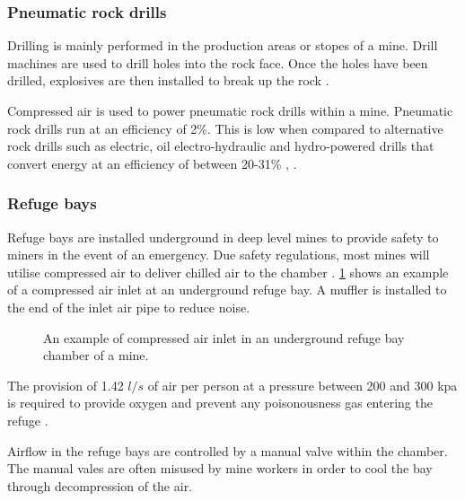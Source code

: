 \subsubsection{Pneumatic rock drills}
Drilling is mainly performed in the production areas or stopes of a mine. Drill machines are used to drill holes into the rock face. Once the holes have been drilled, explosives are then installed to break up the rock \cite{van2008development}.
\par
Compressed air is used to power pneumatic rock drills within a mine. Pneumatic rock drills run at an efficiency of 2\%. This is low when compared to alternative rock drills such as electric, oil electro-hydraulic and hydro-powered drills that convert energy at an efficiency of between 20-31\% \cite{fraser2008saving}, \cite{vanTonder2010Masters}. 
\subsubsection{Refuge bays}
Refuge bays are installed underground in deep level mines to provide safety to miners in the event of an emergency. Due safety regulations, most mines will utilise compressed air to deliver chilled air to the chamber \cite{brake1999criteria}. \cref{fig: Refuge Bay} shows an example of a compressed air inlet at an underground refuge bay. A muffler is installed to the end of the inlet air pipe to reduce noise.
\begin{figure}[h]
	\centering
	\caption{An example of compressed air inlet in an underground refuge bay chamber of a mine.}
	\label{fig: Refuge Bay}
\end{figure}
\par The provision of 1.42 $l/s$ of air per person at a pressure between 200 and 300 \gls{kpa} is required to provide oxygen and prevent any poisonousness gas entering the refuge \cite{brake1999criteria}.\par
Airflow in the refuge bays are controlled by a manual valve within the chamber. The manual vales are often misused by mine workers in order to cool the bay through decompression of the air. %
